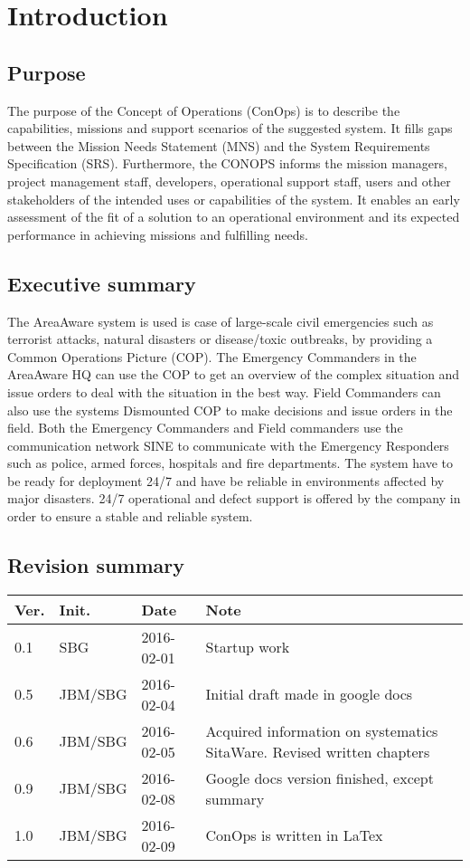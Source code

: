 \chapter{Introduction}
\label{chp_intro}

\section{Purpose}
The purpose of the Concept of Operations (ConOps) is to describe the capabilities, missions and support scenarios of the suggested system. It fills gaps between the Mission Needs Statement (MNS) and the System Requirements Specification (SRS).
Furthermore, the CONOPS informs the mission managers, project management staff, developers, operational support staff, users and other stakeholders of the intended uses or capabilities of the system. It enables an early assessment of the fit of a solution to an operational environment and its expected performance in achieving missions and fulfilling needs.

\section{Executive summary}
The AreaAware system is used is case of large-scale civil emergencies such as terrorist attacks, natural disasters or disease/toxic outbreaks, by providing a Common Operations Picture (COP). The Emergency Commanders in the AreaAware HQ can use the COP to get an overview of the complex situation and issue orders to deal with the situation in the best way. Field Commanders can also use the systems Dismounted COP to make decisions and issue orders in the field. Both the Emergency Commanders and Field commanders use the communication network SINE to communicate with the Emergency Responders such as police, armed forces, hospitals and fire departments. The system have to be ready for deployment 24/7 and have be reliable in environments affected by major disasters. 24/7 operational and defect support is offered by the company in order to ensure a stable and reliable system.

\section{Revision summary}

\begin{tabular}{b{1cm} b{2cm} b{2cm} b{7cm}}
    \textbf{Ver.} & \textbf{Init.} & \textbf{Date} & \textbf{Note} \\
    \hline
    0.1  & SBG		& 2016-02-01 & Startup work \\
    0.5  & JBM/SBG	& 2016-02-04 & Initial draft made in google docs \\
    0.6  & JBM/SBG	& 2016-02-05 & Acquired information on systematics SitaWare. Revised written chapters \\
    0.9  & JBM/SBG	& 2016-02-08 & Google docs version finished, except summary \\
    1.0  & JBM/SBG	& 2016-02-09 & ConOps is written in LaTex \\
\end{tabular}